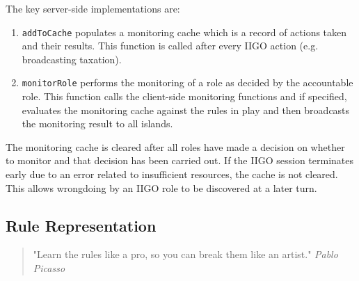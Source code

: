 The key server-side implementations are:
\begin{enumerate}
    \item \texttt{addToCache} populates a monitoring cache which is a record of actions taken and their results. This function is called after every IIGO action (e.g. broadcasting taxation).
    \item \texttt{monitorRole} performs the monitoring of a role as decided by the accountable role. This function calls the client-side monitoring functions and if specified, evaluates the monitoring cache against the rules in play and then broadcasts the monitoring result to all islands.
\end{enumerate}

The monitoring cache is cleared after all roles have made a decision on whether to monitor and that decision has been carried out. If the IIGO session terminates early due to an error related to insufficient resources, the cache is not cleared. This allows wrongdoing by an IIGO role to be discovered at a later turn.

\subsection{Rule Representation}

\begin{quote}
    "Learn the rules like a pro, so you can break them like an artist."
    \linebreak
    \noindent \emph{Pablo Picasso}
\end{quote}

